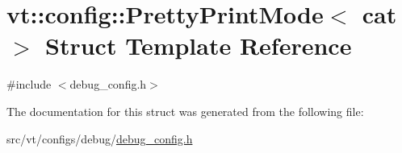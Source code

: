 \hypertarget{structvt_1_1config_1_1_pretty_print_mode}{}\section{vt\+:\+:config\+:\+:Pretty\+Print\+Mode$<$ cat $>$ Struct Template Reference}
\label{structvt_1_1config_1_1_pretty_print_mode}


{\ttfamily \#include $<$debug\+\_\+config.\+h$>$}



The documentation for this struct was generated from the following file\+:\begin{DoxyCompactItemize}
\item 
src/vt/configs/debug/\hyperlink{debug__config_8h}{debug\+\_\+config.\+h}\end{DoxyCompactItemize}
